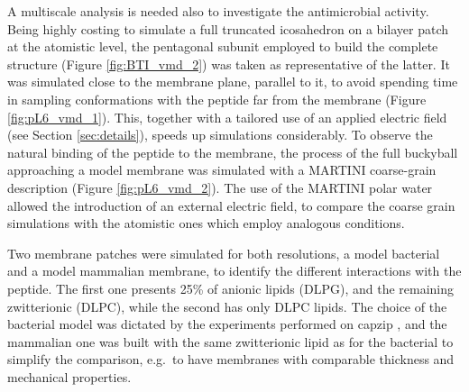 A multiscale analysis is needed also to investigate the antimicrobial activity. Being highly costing to simulate a full truncated icosahedron on a bilayer patch at the atomistic level, the pentagonal subunit employed to build the complete structure (Figure \ref{fig:BTI_vmd_2}) was taken as representative of the latter. It was simulated close to the membrane plane, parallel to it, to avoid spending time in sampling conformations with the peptide far from the membrane (Figure \ref{fig:pL6_vmd_1}). This, together with a tailored use of an applied electric field (see Section \ref{sec:details}), speeds up simulations considerably.
%
To observe the natural binding of the peptide to the membrane, the process of the full buckyball approaching a model membrane was simulated with a MARTINI coarse-grain description (Figure \ref{fig:pL6_vmd_2}). The use of the MARTINI polar water \citep{Yesylevskyy2010} allowed the introduction of an external electric field, to compare the coarse grain simulations with the atomistic ones which employ analogous conditions.

Two membrane patches were simulated for both resolutions, a model bacterial and a model mammalian membrane, to identify the different interactions with the peptide. The first one presents 25\% of anionic lipids (DLPG), and the remaining zwitterionic (DLPC), while the second has only DLPC lipids. The choice of the bacterial model was dictated by the experiments performed on capzip \citep{Castelletto2016}, and the mammalian one was built with the same zwitterionic lipid as for the bacterial to simplify the comparison, e.g.\ to have membranes with comparable thickness and mechanical properties.

